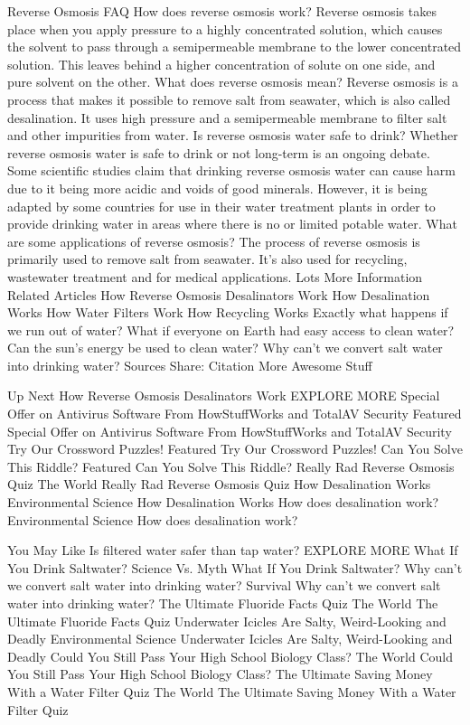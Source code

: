 Reverse Osmosis FAQ
How does reverse osmosis work?
Reverse osmosis takes place when you apply pressure to a highly concentrated solution, which causes the solvent to pass through a semipermeable membrane to the lower concentrated solution. This leaves behind a higher concentration of solute on one side, and pure solvent on the other.
What does reverse osmosis mean?
Reverse osmosis is a process that makes it possible to remove salt from seawater, which is also called desalination. It uses high pressure and a semipermeable membrane to filter salt and other impurities from water.
Is reverse osmosis water safe to drink?
Whether reverse osmosis water is safe to drink or not long-term is an ongoing debate. Some scientific studies claim that drinking reverse osmosis water can cause harm due to it being more acidic and voids of good minerals. However, it is being adapted by some countries for use in their water treatment plants in order to provide drinking water in areas where there is no or limited potable water.
What are some applications of reverse osmosis?
The process of reverse osmosis is primarily used to remove salt from seawater. It’s also used for recycling, wastewater treatment and for medical applications.
Lots More Information
Related Articles
How Reverse Osmosis Desalinators Work
How Desalination Works
How Water Filters Work
How Recycling Works
Exactly what happens if we run out of water?
What if everyone on Earth had easy access to clean water?
Can the sun's energy be used to clean water?
Why can't we convert salt water into drinking water?
Sources
Share:
Citation
More Awesome Stuff

Up Next
How Reverse Osmosis Desalinators Work
EXPLORE MORE
Special Offer on Antivirus Software From HowStuffWorks and TotalAV Security
Featured
Special Offer on Antivirus Software From HowStuffWorks and TotalAV Security
Try Our Crossword Puzzles!
Featured
Try Our Crossword Puzzles!
Can You Solve This Riddle?
Featured
Can You Solve This Riddle?
Really Rad Reverse Osmosis Quiz
The World
Really Rad Reverse Osmosis Quiz
How Desalination Works
Environmental Science
How Desalination Works
How does desalination work?
Environmental Science
How does desalination work?

You May Like
Is filtered water safer than tap water?
EXPLORE MORE
What If You Drink Saltwater?
Science Vs. Myth
What If You Drink Saltwater?
Why can't we convert salt water into drinking water?
Survival
Why can't we convert salt water into drinking water?
The Ultimate Fluoride Facts Quiz
The World
The Ultimate Fluoride Facts Quiz
Underwater Icicles Are Salty, Weird-Looking and Deadly
Environmental Science
Underwater Icicles Are Salty, Weird-Looking and Deadly
Could You Still Pass Your High School Biology Class?
The World
Could You Still Pass Your High School Biology Class?
The Ultimate Saving Money With a Water Filter Quiz
The World
The Ultimate Saving Money With a Water Filter Quiz

